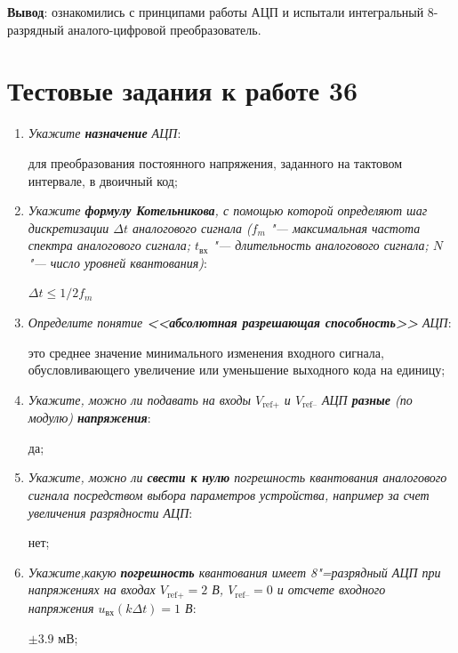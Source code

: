 \documentclass[spec, och, labwork]{shiza}
\begin{document}
\textbf{Вывод}: ознакомились с принципами работы АЦП и испытали
интегральный 8-разрядный аналого-цифровой преобразователь.


\section*{Тестовые задания к работе 36}

\begin{enumerate}
    \item
        \textit{Укажите \textbf{назначение} АЦП}:

        для преобразования постоянного напряжения, заданного на тактовом
        интервале, в двоичный код;
    
    \item
        \textit{Укажите \textbf{формулу Котельникова}, с помощью которой
        определяют шаг дискретизации $\Delta t$ аналогового сигнала ($f_m$ "---
        максимальная частота спектра аналогового сигнала; $t_\text{вх}$ "---
        длительность аналогового сигнала; $N$ "--- число уровней квантования)}:

        $\Delta t \leq 1/2 f_m$
    
    \item
        \textit{Определите понятие \textbf{<<абсолютная разрешающая
        способность>>} АЦП}:

        это среднее значение минимального изменения входного сигнала,
        обусловливающего увеличение или уменьшение выходного кода на единицу;

    \item
        \textit{Укажите, можно ли подавать на входы $V_\text{ref+}$ и
        $V_\text{ref–}$ АЦП \textbf{разные} (по модулю) \textbf{напряжения}}:

        да;
    
    \item
        \textit{Укажите, можно ли \textbf{свести к нулю} погрешность квантования
        аналогового сигнала посредством выбора параметров устройства, например
        за счет увеличения разрядности АЦП}:
    
        нет;

    \item
        \textit{Укажите,какую \textbf{погрешность} квантования имеет
        8"=разрядный АЦП при напряжениях на входах $V_\text{ref+} = 2$ В,
        $V_\text{ref–} = 0$ и отсчете входного напряжения $u_\text{вх}(k \Delta
        t) = 1$ В}:

        $\pm 3.9$ мВ;


\end{enumerate}
\end{document}
